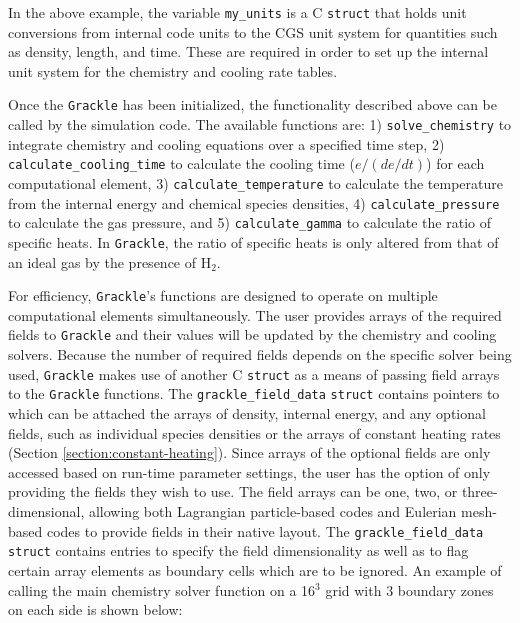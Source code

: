 In the above example, the variable \texttt{my\_units} is a C
\texttt{struct} that holds unit conversions from internal code units
to the CGS unit system for quantities such as density, length, and
time.  These are required in order to set up the internal unit system
for the chemistry and cooling rate tables.

Once the \texttt{Grackle} has been initialized, the functionality described
above can be called by the simulation code.  The available functions
are: 1) \texttt{solve\_chemistry} to integrate chemistry and cooling
equations over a specified time step, 2)
\texttt{calculate\_cooling\_time} to calculate the cooling time
($e/(de/dt)$) for each computational element, 3)
\texttt{calculate\_temperature} to calculate the temperature from the
internal energy and chemical species densities, 4)
\texttt{calculate\_pressure} to calculate the gas pressure, and 5)
\texttt{calculate\_gamma} to calculate the ratio of specific heats.
In \texttt{Grackle}, the ratio of specific heats is only altered from that
of an ideal gas by the presence of H$_{2}$.

For efficiency, \texttt{Grackle}'s functions are designed to operate on
multiple computational elements simultaneously.  The user provides
arrays of the required fields to \texttt{Grackle} and their values will be
updated by the chemistry and cooling solvers.  Because the number of
required fields depends on the specific solver being used, \texttt{Grackle}
makes use of another C \texttt{struct} as a means of passing field
arrays to the \texttt{Grackle} functions.  The \texttt{grackle\_field\_data}
\texttt{struct} contains pointers to which can be attached the arrays
of density, internal energy, and any optional fields, such as
individual species densities or the arrays of constant heating rates
(Section \ref{section:constant-heating}).  Since arrays of the
optional fields are only accessed based on run-time parameter
settings, the user has the option of only providing the fields they
wish to use.  The field arrays can be one, two, or three-dimensional,
allowing both Lagrangian particle-based codes and Eulerian mesh-based
codes to provide fields in their native layout.  The
\texttt{grackle\_field\_data} \texttt{struct} contains entries to
specify the field dimensionality as well as to flag certain array
elements as boundary cells which are to be ignored.  An example of
calling the main chemistry solver function on a 16$^{3}$ grid with 3
boundary zones on each side is shown below:

